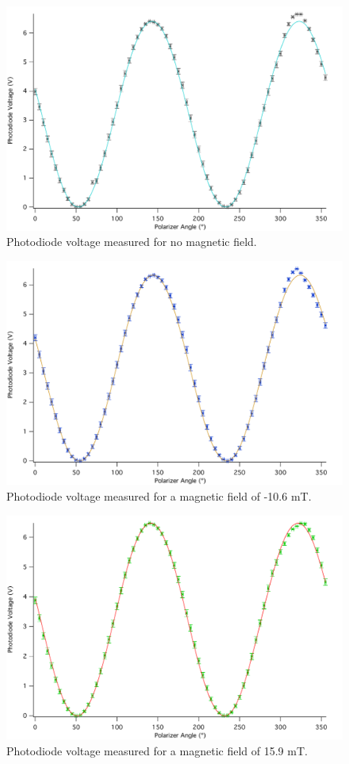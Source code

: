 \documentclass[prb,preprint]{revtex4-1}
\begin{document}
{{{{{{\begin{figure}
\includegraphics[width = 6.3in]{0A.pdf}
\caption{\label{nofield}Photodiode voltage measured for no magnetic field.}
\end{figure}

\begin{figure}
\includegraphics[width = 6.3in]{n1A.pdf}
\caption{\label{neg}Photodiode voltage measured for a magnetic field of -10.6 mT.}
\end{figure}

\begin{figure}
\includegraphics[width = 6.3in]{15A.pdf}
\caption{\label{onehalf}Photodiode voltage measured for a magnetic field of 15.9 mT.}
\end{figure}

}}}}}}
\end{document}
